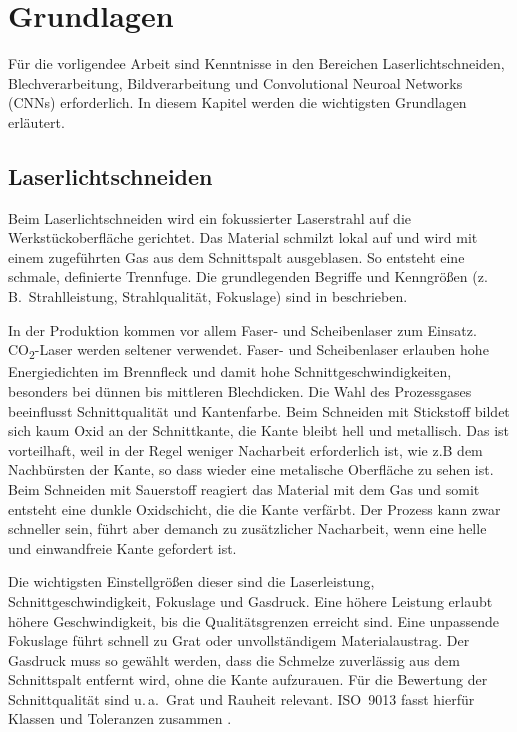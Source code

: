 \chapter{Grundlagen}

Für die vorligendee Arbeit sind Kenntnisse in den Bereichen Laserlichtschneiden, Blechverarbeitung, Bildverarbeitung und Convolutional Neuroal Networks (CNNs) erforderlich. In diesem Kapitel werden die wichtigsten Grundlagen erläutert.

\section{Laserlichtschneiden}

Beim Laserlichtschneiden wird ein fokussierter Laserstrahl auf die Werkstückoberfläche gerichtet. Das Material schmilzt lokal auf und wird mit einem zugeführten Gas aus dem Schnittspalt ausgeblasen. So entsteht eine schmale, definierte Trennfuge. Die grundlegenden Begriffe und Kenngrößen (z.\,B.\ Strahlleistung, Strahlqualität, Fokuslage) sind in \parencite{ISO11145-2018} beschrieben.

In der Produktion kommen vor allem Faser- und Scheibenlaser zum Einsatz. CO\textsubscript{2}-Laser werden seltener verwendet. Faser- und Scheibenlaser erlauben hohe Energiedichten im Brennfleck und damit hohe Schnittgeschwindigkeiten, besonders bei dünnen bis mittleren Blechdicken. Die Wahl des Prozessgases beeinflusst Schnittqualität und Kantenfarbe. Beim Schneiden mit Stickstoff bildet sich kaum Oxid an der Schnittkante, die Kante bleibt hell und metallisch. Das ist vorteilhaft, weil in der Regel weniger Nacharbeit erforderlich ist, wie z.B dem Nachbürsten der Kante, so dass wieder eine metalische Oberfläche zu sehen ist. Beim Schneiden mit Sauerstoff reagiert das Material mit dem Gas und somit entsteht eine dunkle Oxidschicht, die die Kante verfärbt. Der Prozess kann zwar schneller sein, führt aber demanch zu zusätzlicher Nacharbeit, wenn eine helle und einwandfreie Kante gefordert ist.

Die wichtigsten Einstellgrößen dieser sind die Laserleistung, Schnittgeschwindigkeit, Fokuslage und Gasdruck. Eine höhere Leistung erlaubt höhere Geschwindigkeit, bis die Qualitätsgrenzen erreicht sind. Eine unpassende Fokuslage führt schnell zu Grat oder unvollständigem Materialaustrag. Der Gasdruck muss so gewählt werden, dass die Schmelze zuverlässig aus dem Schnittspalt entfernt wird, ohne die Kante aufzurauen. Für die Bewertung der Schnittqualität sind u.\,a.\ Grat und Rauheit relevant. ISO~9013 fasst hierfür Klassen und Toleranzen zusammen \parencite{ISO9013-2017}.

